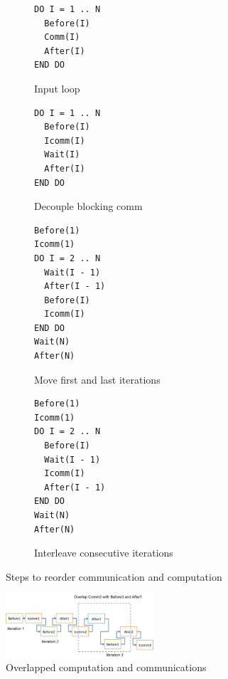 \begin{figure}
{\scriptsize
  \centering
  \begin{subfigure}[b]{.25\textwidth}
\begin{verbatim}
DO I = 1 .. N
  Before(I)
  Comm(I)
  After(I)
END DO
\end{verbatim}
    \caption{Input loop}
    \label{fig:cco:reorder:a}
    \vspace{.1in}
  \end{subfigure}
  \begin{subfigure}[b]{.25\textwidth}
\begin{verbatim}
DO I = 1 .. N
  Before(I)
  Icomm(I)
  Wait(I)
  After(I)
END DO
\end{verbatim}
    \caption{Decouple blocking comm}
    \label{fig:cco:reorder:b}
    \vspace{.1in}
  \end{subfigure}
  \begin{subfigure}[b]{.25\textwidth}
\begin{verbatim}
Before(1)
Icomm(1)
DO I = 2 .. N
  Wait(I - 1)
  After(I - 1)
  Before(I)
  Icomm(I)
END DO
Wait(N)
After(N)
\end{verbatim}
    \caption{Move first and last iterations}
    \label{fig:cco:reorder:c}
    \vspace{.1in}
  \end{subfigure}
  \begin{subfigure}[b]{.25\textwidth}
\begin{verbatim}
Before(1)
Icomm(1)
DO I = 2 .. N
  Before(I)
  Wait(I - 1)
  Icomm(I)
  After(I - 1)
END DO
Wait(N)
After(N)
\end{verbatim}
    \caption{Interleave consecutive iterations}
    \label{fig:cco:reorder:d}
  \end{subfigure}
\caption{Steps to reorder communication and computation}
\label{fig:cco:reorder}
}
\end{figure}

\begin{figure}[h]
\centering
\includegraphics[width=0.49\textwidth]{fig/ft_shift.png}
\caption{Overlapped computation and communications}
\label{fig:cco:shift}
\end{figure}

